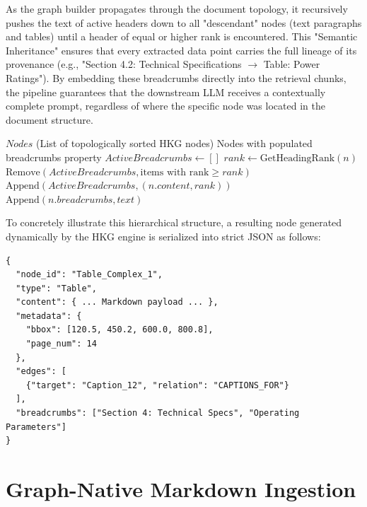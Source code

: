 As the graph builder propagates through the document topology, it recursively pushes the text of active headers down to all "descendant" nodes (text paragraphs and tables) until a header of equal or higher rank is encountered. This "Semantic Inheritance" ensures that every extracted data point carries the full lineage of its provenance (e.g., "Section 4.2: Technical Specifications $\rightarrow$ Table: Power Ratings"). By embedding these breadcrumbs directly into the retrieval chunks, the pipeline guarantees that the downstream LLM receives a contextually complete prompt, regardless of where the specific node was located in the document structure.

\begin{algorithm}[H]
\caption{HKG Breadcrumb Propagation (Pass 3)}
\label{alg:hkg_breadcrumbs}
\begin{algorithmic}[1]
\REQUIRE $Nodes$ (List of topologically sorted HKG nodes)
\ENSURE Nodes with populated {\selectfont breadcrumbs} property
\STATE $ActiveBreadcrumbs \leftarrow []$
        \STATE $rank \leftarrow \text{GetHeadingRank}(n)$
        \STATE $\text{Remove}(ActiveBreadcrumbs, \text{items with rank} \ge rank)$
        \STATE $\text{Append}(ActiveBreadcrumbs, (n.content, rank))$
            \STATE $\text{Append}(n.breadcrumbs, text)$
        \ENDFOR
    \ENDIF
\ENDFOR
\end{algorithmic}
\end{algorithm}

To concretely illustrate this hierarchical structure, a resulting node generated dynamically by the HKG engine is serialized into strict JSON as follows:

\begin{verbatim}
{
  "node_id": "Table_Complex_1",
  "type": "Table",
  "content": { ... Markdown payload ... },
  "metadata": {
    "bbox": [120.5, 450.2, 600.0, 800.8],
    "page_num": 14
  },
  "edges": [
    {"target": "Caption_12", "relation": "CAPTIONS_FOR"}
  ],
  "breadcrumbs": ["Section 4: Technical Specs", "Operating Parameters"]
}
\end{verbatim}

\section{Graph-Native Markdown Ingestion}
\label{sec:markdown_assembly}

